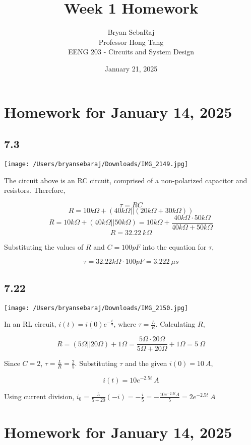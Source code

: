 \documentclass{article}
\title{Week 1 Homework}
\author{Bryan SebaRaj \\[0.7em] Professor Hong Tang \\[0.7em]  EENG 203 - Circuits and System Design}
\date{January 21, 2025}
\begin{document}
\maketitle

\section*{Homework for January 14, 2025}

\subsection*{7.3}

\texttt{[image: /Users/bryansebaraj/Downloads/IMG\_2149.jpg]}

The circuit above is an RC circuit, comprised of a non-polarized capacitor and resistors. Therefore,

$$\tau = RC$$
$$R=10 k\Omega + (40 k\Omega || (20 k\Omega + 30 k\Omega))$$
$$R=10 k\Omega + (40 k\Omega || 50 k\Omega)=10 k\Omega + \frac{40 k\Omega \cdot 50 k\Omega}{40 k\Omega + 50 k\Omega}$$
$$R=32.22 \ k\Omega$$

Substituting the values of $R$ and $C=100 pF$ into the equation for $\tau$,

$$\tau = 32.22 k\Omega \cdot 100 pF = 3.222 \ \mu s$$

\subsection*{7.22}

\texttt{[image: /Users/bryansebaraj/Downloads/IMG\_2150.jpg]}

In an RL circuit, $i(t)=i(0)e^{-\frac{t}{\tau}}$, where $\tau = \frac{L}{R}$. Calculating $R$,

$$R=(5\Omega || 20 \Omega) + 1 \Omega = \frac{5 \Omega \cdot 20 \Omega}{5 \Omega + 20 \Omega} + 1 \Omega = 5 \ \Omega$$

Since $C=2$, $\tau = \frac{L}{R} = \frac{2}{5}$. Substituting $\tau$ and the given $i(0)=10 \ A$, 

$$i(t)=10e^{-2.5t} \ A$$

Using current division, $i_0=\frac{5}{5+20}(-i)=-\frac{i}{5}=-\frac{10e^{-2.5t}A}{5}=2e^{-2.5t} \ A$

\section*{Homework for January 14, 2025}
\end{document}
